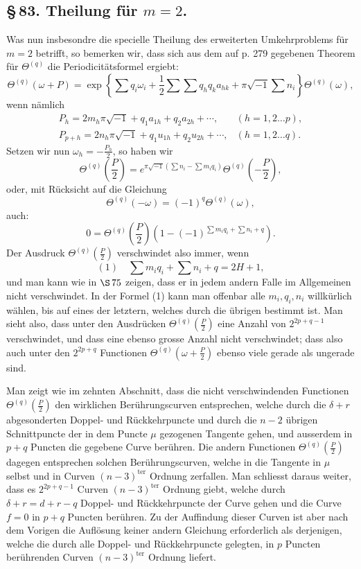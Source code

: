 \documentclass[10pt]{article}
\begin{document}
\subsection*{\S\,83. Theilung für \(m=2\).}

Was nun insbesondre die specielle Theilung des erweiterten Umkehrproblems für \(m=2\) betrifft, so bemerken wir, dass sich aus dem auf p. 279 gegebenen Theorem für \(\Theta^{(q)}\) die Periodicitätsformel ergiebt:
\[
\Theta^{(q)}(\omega+P)=
\exp\!\left\{\sum q_i\omega_i+\frac12\sum\sum q_hq_ka_{hk}
+\pi\sqrt{-1}\sum n_i\right\}\Theta^{(q)}(\omega),
\]
wenn nämlich
\[
\begin{array}{ll}
P_h=2m_h\pi\sqrt{-1}+q_1a_{1h}+q_2a_{2h}+\cdots,&(h=1,2\ldots p),\\
P_{p+h}=2n_h\pi\sqrt{-1}+q_1u_{1h}+q_2u_{2h}+\cdots,&(h=1,2\ldots q).
\end{array}
\]
Setzen wir nun \(\omega_h=-\frac{P_h}{2}\), so haben wir
\[
\Theta^{(q)}\!\left(\frac P2\right)
=e^{\pi\sqrt{-1}\left(\sum n_i-\sum m_iq_i\right)}
\Theta^{(q)}\!\left(-\frac P2\right),
\]
oder, mit Rücksicht auf die Gleichung
\[
\Theta^{(q)}(-\omega)=(-1)^q\Theta^{(q)}(\omega),
\]
auch:
\[
0=\Theta^{(q)}\!\left(\frac P2\right)
\left(1-(-1)^{\sum m_iq_i+\sum n_i+q}\right).
\]
Der Ausdruck \(\Theta^{(q)}\!\left(\frac P2\right)\) verschwindet also immer, wenn
\[
(1)\quad \sum m_iq_i+\sum n_i+q=2H+1,
\]
und man kann wie in \(\S\,75\) zeigen, dass er in jedem andern Falle im Allgemeinen nicht verschwindet. In der Formel (1) kann man offenbar alle \(m_i,q_i,n_i\) willkürlich wählen, bis auf eines der letztern, welches durch die übrigen bestimmt ist. Man sieht also, dass unter den Ausdrücken \(\Theta^{(q)}\!\left(\frac P2\right)\) eine Anzahl von \(2^{2p+q-1}\) verschwindet, und dass eine ebenso grosse Anzahl nicht verschwindet; dass also auch unter den \(2^{2p+q}\) Functionen \(\Theta^{(q)}\!\left(\omega+\frac P2\right)\) ebenso viele gerade als ungerade sind.

Man zeigt wie im zehnten Abschnitt, dass die nicht verschwindenden Functionen \(\Theta^{(q)}\!\left(\frac P2\right)\) den wirklichen Berührungscurven entsprechen, welche durch die \(\delta+r\) abgesonderten Doppel- und Rückkehrpuncte und durch die \(n-2\) übrigen Schnittpuncte der in dem Puncte \(\mu\) gezogenen Tangente gehen, und ausserdem in \(p+q\) Puncten die gegebene Curve berühren. Die andern Functionen \(\Theta^{(q)}\!\left(\frac P2\right)\) dagegen entsprechen solchen Berührungscurven, welche in die Tangente in \(\mu\) selbst und in Curven \((n-3)^{\mathrm{ter}}\) Ordnung zerfallen. Man schliesst daraus weiter, dass es \(2^{2p+q-1}\) Curven \((n-3)^{\mathrm{ter}}\) Ordnung giebt, welche durch \(\delta+r=d+r-q\) Doppel- und Rückkehrpuncte der Curve gehen und die Curve \(f=0\) in \(p+q\) Puncten berühren. Zu der Auffindung dieser Curven ist aber nach dem Vorigen die Auflösung keiner andern Gleichung erforderlich als derjenigen, welche die durch alle Doppel- und Rückkehrpuncte gelegten, in \(p\) Puncten berührenden Curven \((n-3)^{\mathrm{ter}}\) Ordnung liefert.
\end{document}
